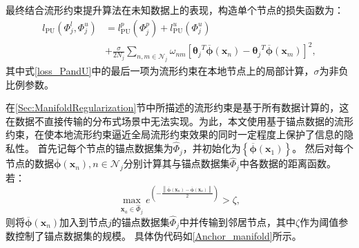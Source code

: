 最终结合流形约束提升算法在未知数据上的表现，构造单个节点的损失函数为：
\begin{equation}
    \label{loss_PandU}
    \begin{split}
        l_{\mathrm{PU}}\left(\boldsymbol\varPhi_j^l,\boldsymbol\varPhi_j^u\right)&=
        l_{\mathrm{PU}}^p\left(\boldsymbol \varPhi_j^p\right)+l_{\mathrm{PU}}^u\left(\boldsymbol \varPhi_j^u\right) \\
        &+\frac{\sigma }{2N_j} \sum_{n,m\in\mathcal{N}_j} \omega_{nm}\left[{\boldsymbol{\theta}_j}^T\overline{\boldsymbol\phi}\left(\boldsymbol{x}_n\right)
        -{\boldsymbol{\theta}_j}^T\overline{\boldsymbol\phi}\left(\boldsymbol{x}_m\right)\right]^{2},
    \end{split}
\end{equation}
其中式\eqref{loss_PandU}中的最后一项为流形约束在本地节点上的局部计算，$\sigma$为非负比例参数。

{在\ref{Sec:ManifoldRegularization}节中所描述的流形约束是基于所有数据计算的，这在数据不直接传输的分布式场景中无法实现。为此，本文使用基于锚点数据的流形约束，在使本地流形约束逼近全局流形约束效果的同时一定程度上保护了信息的隐私性。}
首先记每个节点的锚点数据集为$\hat{\boldsymbol\varPhi}_j$，并初始化为$\left\{\overline{\boldsymbol\phi}\left(\boldsymbol x_1\right)\right\}$。
然后对每个节点的数据$\overline{\boldsymbol\phi}\left(\boldsymbol x_n\right),n\in\mathcal{N}_j$分别计算其与锚点数据集$\hat{\boldsymbol\varPhi}_j$中各数据的距离函数。若：
\begin{equation}
    \label{Anchor_manifold_condition}
    \max_{\boldsymbol x_{a}\in\hat{\boldsymbol\varPhi}_j}e^{\left(-\frac{\left\|\overline{\boldsymbol\phi}\left(\boldsymbol x_n\right)
    -\overline{\boldsymbol\phi}\left(\boldsymbol x_a\right)\right\|}{2}\right)}>\zeta,
\end{equation}
则将$\overline{\boldsymbol\phi}\left(\boldsymbol x_n\right)$加入到节点$j$的锚点数据集$\hat{\boldsymbol\varPhi}_j$中并传输到邻居节点，其中$\zeta$作为阈值参数控制了锚点数据集的规模。
具体伪代码如\autoref{Anchor_manifold}所示。

